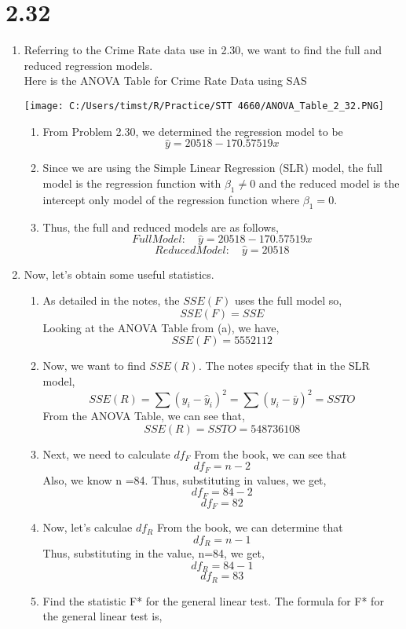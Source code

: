 \documentclass{article}
\begin{document}
\section*{2.32}
	\begin{enumerate}[label = \alph*)]
		\item Referring to the Crime Rate data use in 2.30, we want to find the full and reduced regression models.\\
		Here is the ANOVA Table for Crime Rate Data using SAS
		
			\texttt{[image: C:/Users/timst/R/Practice/STT 4660/ANOVA\_Table\_2\_32.PNG]}
		\begin{enumerate}[label = \arabic*)]
			\item From Problem 2.30, we determined the regression model to be 
			\[\hat{y} = 20518 - 170.57519x\]
			\item Since we are using the Simple Linear Regression (SLR) model, the full model is the regression function with $\beta_1 \neq 0$ and the reduced model is the intercept only model of the regression function where $\beta_1 = 0$.
			\item Thus, the full and reduced models are as follows,
			\[Full Model:\quad \hat{y} = 20518 - 170.57519x\]
			\[Reduced Model:\quad \hat{y} = 20518 \]
		\end{enumerate}
		\item Now, let's obtain some useful statistics.
		\begin{enumerate}[label = \arabic*)]
			\item As detailed in the notes, the $SSE(F)$ uses the full model so,
			\[SSE(F) = SSE\]
			 Looking at the ANOVA Table from (a), we have,
			\[SSE(F) = 5552112\]
			\item Now, we want to find $SSE(R)$.
			 The notes specify that in the SLR model,
			\[SSE(R) = \sum (y_i - \hat{y}_i)^2 = \sum (y_i - \bar{y})^2 = SSTO\] 
			From the ANOVA Table, we can see that,
			\[SSE(R) = SSTO = 548736108\]
			\item Next, we need to calculate $df_F$
			From the book, we can see that 
			\[df_F = n-2\]
			Also, we know n =84.
			Thus, substituting in values, we get,
			\[df_F = 84-2\]
			\[df_F = 82\]
			\item Now, let's calculae $df_R$
			From the book, we can determine that
			\[df_R = n-1\]
			Thus, substituting in the value, n=84, we get,
			\[df_R = 84-1\]
			\[df_R = 83\]
			\item Find the statistic F* for the general linear test.
			The formula for F* for the general linear test is,

\end{enumerate}
\end{enumerate}
\end{document}
